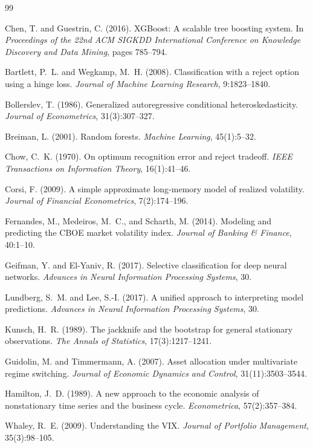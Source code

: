 \documentclass[11pt]{article}
\begin{document}
\begin{thebibliography}{99}

Chen, T. and Guestrin, C. (2016).
\newblock XGBoost: A scalable tree boosting system.
\newblock In \emph{Proceedings of the 22nd ACM SIGKDD International Conference on Knowledge Discovery and Data Mining}, pages 785--794.

Bartlett, P.~L. and Wegkamp, M.~H. (2008).
\newblock Classification with a reject option using a hinge loss.
\newblock \emph{Journal of Machine Learning Research}, 9:1823--1840.

Bollerslev, T. (1986).
\newblock Generalized autoregressive conditional heteroskedasticity.
\newblock \emph{Journal of Econometrics}, 31(3):307--327.

Breiman, L. (2001).
\newblock Random forests.
\newblock \emph{Machine Learning}, 45(1):5--32.

Chow, C.~K. (1970).
\newblock On optimum recognition error and reject tradeoff.
\newblock \emph{IEEE Transactions on Information Theory}, 16(1):41--46.

Corsi, F. (2009).
\newblock A simple approximate long-memory model of realized volatility.
\newblock \emph{Journal of Financial Econometrics}, 7(2):174--196.

Fernandes, M., Medeiros, M.~C., and Scharth, M. (2014).
\newblock Modeling and predicting the CBOE market volatility index.
\newblock \emph{Journal of Banking \& Finance}, 40:1--10.

Geifman, Y. and El-Yaniv, R. (2017).
\newblock Selective classification for deep neural networks.
\newblock \emph{Advances in Neural Information Processing Systems}, 30.

Lundberg, S.~M. and Lee, S.-I. (2017).
\newblock A unified approach to interpreting model predictions.
\newblock \emph{Advances in Neural Information Processing Systems}, 30.

Kunsch, H.~R. (1989).
\newblock The jackknife and the bootstrap for general stationary observations.
\newblock \emph{The Annals of Statistics}, 17(3):1217--1241.

Guidolin, M. and Timmermann, A. (2007).
\newblock Asset allocation under multivariate regime switching.
\newblock \emph{Journal of Economic Dynamics and Control}, 31(11):3503--3544.

Hamilton, J.~D. (1989).
\newblock A new approach to the economic analysis of nonstationary time series and the business cycle.
\newblock \emph{Econometrica}, 57(2):357--384.

Whaley, R.~E. (2009).
\newblock Understanding the VIX.
\newblock \emph{Journal of Portfolio Management}, 35(3):98--105.

\end{thebibliography}
\end{document}
